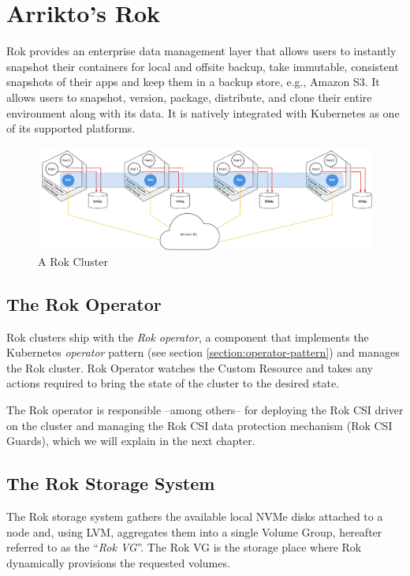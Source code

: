 \section{Arrikto's Rok}

Rok provides an enterprise data management layer that allows users to instantly
snapshot their containers for local and offsite backup, take immutable,
consistent snapshots of their apps and keep them in a backup store, e.g., Amazon
S3. It allows users to snapshot, version, package, distribute, and clone their
entire environment along with its data. It is natively integrated with
Kubernetes as one of its supported platforms.

\begin{figure}[ht]
    \centering
    \includegraphics[width=\textwidth]{resources/rok-cluster-f.pdf}
    \caption{A Rok Cluster}
\end{figure}

\subsection{The Rok Operator}
\label{section:background-rok-operator}

Rok clusters ship with the \textit{Rok operator}, a component that implements
the Kubernetes \textit{operator} pattern (see section
\ref{section:operator-pattern}) and manages the Rok cluster. Rok Operator
watches the  Custom Resource and takes any actions required to
bring the state of the cluster to the desired state. 

The Rok operator is responsible
--among others-- for deploying the Rok CSI driver on the cluster and managing
the Rok CSI data protection mechanism (Rok CSI Guards), which we will explain in
the next chapter.

\subsection{The Rok Storage System}
\label{section:background-rok-csi}

The Rok storage system gathers the available local NVMe disks attached to a node
and, using LVM, aggregates them into a single Volume Group, hereafter referred
to as the ``\textit{Rok VG}''. The Rok VG is the storage place where Rok
dynamically provisions the requested volumes.

